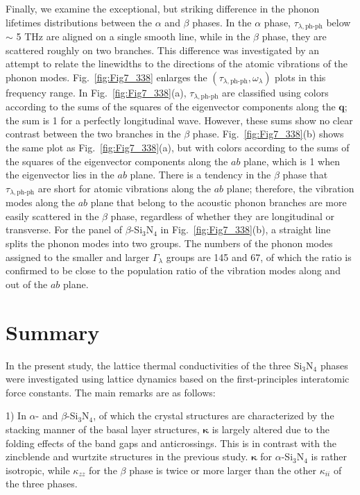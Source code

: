\documentclass[twocolumn,amsmath,amssymb,a4paper,prb,superscriptaddress,floatfix]{revtex4-1}
\begin{document}
Finally, we examine the exceptional, but striking difference in the phonon
lifetimes
distributions between the $\alpha$ and $\beta$ phases. In the $\alpha$ phase,
$\tau_{\lambda,\text{ph-ph}}$ below $\sim$ 5 THz are aligned on a single smooth line, while in
the $\beta$ phase, they are scattered roughly on two branches. This difference
was investigated by an attempt to relate the linewidths to the directions of the
atomic vibrations of the phonon modes. Fig.~\ref{fig:Fig7_338} enlarges the
$(\tau_{\lambda,\text{ph-ph}},\omega_\lambda)$ plots in this frequency range. In
Fig.~\ref{fig:Fig7_338}(a), $\tau_{\lambda,\text{ph-ph}}$ are classified using colors
according to the sums of the squares of the eigenvector components along the
$\mathbf{q}$; the sum is 1 for a perfectly longitudinal wave. However, these
sums show no clear contrast between the two branches in the $\beta$ phase.
Fig.~\ref{fig:Fig7_338}(b) shows the same plot as Fig.~\ref{fig:Fig7_338}(a),
but with colors according to the sums of the squares of the eigenvector
components along the $ab$ plane, which is 1 when the eigenvector lies in the
$ab$ plane.  There is a tendency in the $\beta$ phase that
$\tau_{\lambda,\text{ph-ph}}$ are
short for atomic vibrations along the $ab$ plane; therefore, the vibration modes
along the $ab$ plane that belong to the acoustic phonon branches are more easily
scattered in the $\beta$ phase, regardless of whether they are longitudinal or
transverse. For the panel of $\beta$-Si$_3$N$_4$ in Fig.~\ref{fig:Fig7_338}(b),
a straight line splits the phonon modes into two groups. The numbers of the
phonon modes assigned to the smaller and larger $\Gamma_\lambda$ groups are 145
and 67, of which the ratio is confirmed to be close to the population ratio of
the vibration modes along and out of the $ab$ plane.


\section{Summary}

In the present study, the lattice thermal conductivities of the
three Si$_3$N$_4$ phases were investigated using lattice dynamics based on the
first-principles interatomic force constants. The main remarks are as follows:

1) In $\alpha$- and $\beta$-Si$_3$N$_4$, of which the crystal structures are
characterized by the stacking manner of the basal layer structures,
$\boldsymbol{\kappa}$ is largely altered due to the folding effects of the band
gaps and anticrossings. This is in contrast with the zincblende and wurtzite
structures in the previous study\cite{phono3py}.  $\boldsymbol{\kappa}$ for
$\alpha$-Si$_3$N$_4$ is rather isotropic, while $\kappa$$_{zz}$ for the $\beta$
phase is twice or more larger than the other $\kappa_{ii}$ of the three phases.
\end{document}
